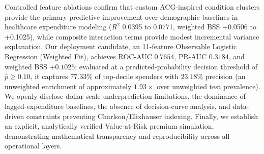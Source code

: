 \documentclass[runningheads]{llncs}
\begin{document}
Controlled feature ablations confirm that custom ACG-inspired condition clusters provide the primary predictive improvement over demographic baselines in healthcare expenditure modeling ($R^2$ 0.0395 to 0.0771, weighted BSS +0.0506 to +0.1025), while composite interaction terms provide modest incremental variance explanation. Our deployment candidate, an 11-feature Observable Logistic Regression (Weighted Fit), achieves ROC-AUC $0.7654$, PR-AUC $0.3184$, and weighted BSS $+0.1025$; evaluated at a predicted-probability decision threshold of $\hat{p} \ge 0.10$, it captures $77.33\%$ of top-decile spenders with $23.18\%$ precision (an unweighted enrichment of approximately $1.93\times$ over unweighted test prevalence). We openly disclose dollar-scale underprediction limitations, the dominance of lagged-expenditure baselines, the absence of decision-curve analysis, and data-driven constraints preventing Charlson/Elixhauser indexing. Finally, we establish an explicit, analytically verified Value-at-Risk premium simulation, demonstrating mathematical transparency and reproducibility across all operational layers.



\end{document}
